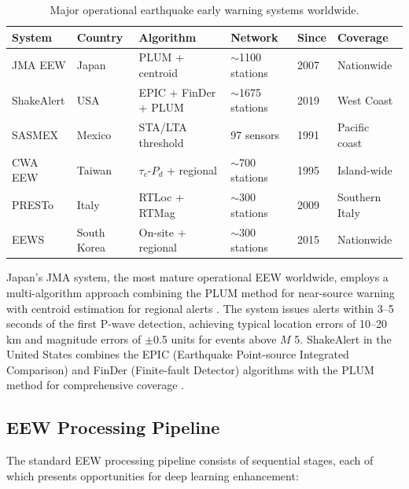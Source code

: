 \documentclass[review,authoryear]{elsarticle}
\begin{document}
\begin{table}[H]
\centering
\caption{Major operational earthquake early warning systems worldwide.}
\label{tab:operational_systems}
\small
\begin{tabular}{p{2.2cm}p{1.5cm}p{2.5cm}p{2.0cm}p{1.5cm}p{2.5cm}}
\toprule
\textbf{System} & \textbf{Country} & \textbf{Algorithm} & \textbf{Network} & \textbf{Since} & \textbf{Coverage} \\
\midrule
JMA EEW & Japan & PLUM + centroid & $\sim$1100 stations & 2007 & Nationwide \\
ShakeAlert & USA & EPIC + FinDer + PLUM & $\sim$1675 stations & 2019 & West Coast \\
SASMEX & Mexico & STA/LTA threshold & 97 sensors & 1991 & Pacific coast \\
CWA EEW & Taiwan & $\tau_c$-$P_d$ + regional & $\sim$700 stations & 1995 & Island-wide \\
PRESTo & Italy & RTLoc + RTMag & $\sim$300 stations & 2009 & Southern Italy \\
EEWS & South Korea & On-site + regional & $\sim$300 stations & 2015 & Nationwide \\
\bottomrule
\end{tabular}
\end{table}

Japan's JMA system, the most mature operational EEW worldwide, employs a multi-algorithm approach combining the PLUM method \citep{kodera2018earthquake} for near-source warning with centroid estimation for regional alerts \citep{hoshiba2011earthquake}. The system issues alerts within 3--5 seconds of the first P-wave detection, achieving typical location errors of 10--20 km and magnitude errors of $\pm$0.5 units for events above $M$ 5. ShakeAlert in the United States combines the EPIC (Earthquake Point-source Integrated Comparison) and FinDer (Finite-fault Detector) algorithms with the PLUM method for comprehensive coverage \citep{given2018revised, bose2018finder, kodera2018earthquake, brown2011elarms}.

\subsection{EEW Processing Pipeline}

The standard EEW processing pipeline consists of sequential stages, each of which presents opportunities for deep learning enhancement:
\end{document}
